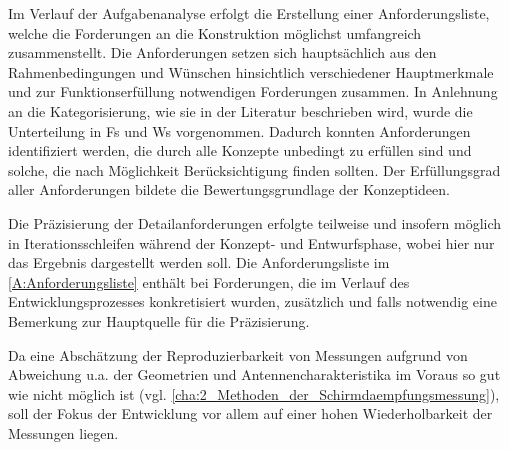 


Im Verlauf der Aufgabenanalyse erfolgt die Erstellung einer Anforderungsliste, welche die Forderungen an die Konstruktion möglichst umfangreich zusammenstellt. Die Anforderungen setzen sich hauptsächlich aus den Rahmenbedingungen und Wünschen hinsichtlich verschiedener Hauptmerkmale und zur Funktionserfüllung notwendigen Forderungen zusammen. In Anlehnung an die Kategorisierung, wie sie in der Literatur beschrieben wird, wurde die Unterteilung in \acp{F} und \acp{W} vorgenommen. Dadurch konnten Anforderungen identifiziert werden, die durch alle Konzepte unbedingt zu erfüllen sind und solche, die nach Möglichkeit Berücksichtigung finden sollten. Der Erfüllungsgrad aller Anforderungen bildete die Bewertungsgrundlage der Konzeptideen.
\par
\vspace{\linespace}
Die Präzisierung der Detailanforderungen erfolgte teilweise und insofern möglich in Iterationsschleifen während der Konzept- und Entwurfsphase, wobei hier nur das Ergebnis dargestellt werden soll. Die Anforderungsliste im \Anhang\ref{A:Anforderungsliste} enthält bei Forderungen, die im Verlauf des Entwicklungsprozesses konkretisiert wurden, zusätzlich und falls notwendig eine Bemerkung zur Hauptquelle für die Präzisierung.
\par
\vspace{\linespace}
Da eine Abschätzung der Reproduzierbarkeit von Messungen aufgrund von Abweichung u.a. der Geometrien und Antennencharakteristika im Voraus so gut wie nicht möglich ist (vgl. \Abschnitt\ref{cha:2_Methoden_der_Schirmdaempfungsmessung}), soll der Fokus der Entwicklung vor allem auf einer hohen Wiederholbarkeit der Messungen liegen.





